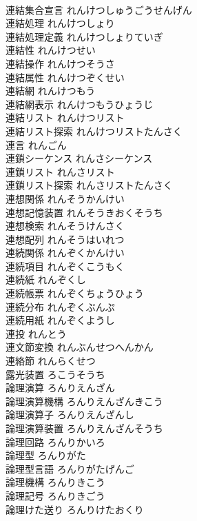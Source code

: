 \documentclass[8pt]{extreport}
\begin{document}
\begin{CJK}{UTF8}{min}
\\	連結集合宣言	れんけつしゅうごうせんげん	
\\	連結処理	れんけつしょり	
\\	連結処理定義	れんけつしょりていぎ	
\\	連結性	れんけつせい	
\\	連結操作	れんけつそうさ	
\\	連結属性	れんけつぞくせい	
\\	連結網	れんけつもう	
\\	連結網表示	れんけつもうひょうじ	
\\	連結リスト	れんけつリスト	
\\	連結リスト探索	れんけつリストたんさく	
\\	連言	れんごん	
\\	連鎖シーケンス	れんさシーケンス	
\\	連鎖リスト	れんさリスト	
\\	連鎖リスト探索	れんさリストたんさく	
\\	連想関係	れんそうかんけい	
\\	連想記憶装置	れんそうきおくそうち	
\\	連想検索	れんそうけんさく	
\\	連想配列	れんそうはいれつ	
\\	連続関係	れんぞくかんけい	
\\	連続項目	れんぞくこうもく	
\\	連続紙	れんぞくし	
\\	連続帳票	れんぞくちょうひょう	
\\	連続分布	れんぞくぶんぷ	
\\	連続用紙	れんぞくようし	
\\	連投	れんとう	
\\	連文節変換	れんぶんせつへんかん	
\\	連絡節	れんらくせつ	
\\	露光装置	ろこうそうち	
\\	論理演算	ろんりえんざん	
\\	論理演算機構	ろんりえんざんきこう	
\\	論理演算子	ろんりえんざんし	
\\	論理演算装置	ろんりえんざんそうち	
\\	論理回路	ろんりかいろ	
\\	論理型	ろんりがた	
\\	論理型言語	ろんりがたげんご	
\\	論理機構	ろんりきこう	
\\	論理記号	ろんりきごう	
\\	論理けた送り	ろんりけたおくり	

\end{CJK}
\end{document}
